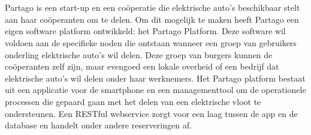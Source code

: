
\chapter{}
\label{ch:inleiding}

Partago is een start-up en een coöperatie die elektrische auto's beschikbaar stelt aan haar coöperanten om te delen. Om dit mogelijk te maken heeft Partago een eigen software platform ontwikkeld: het Partago Platform. Deze software wil voldoen aan de specifieke noden die ontstaan wanneer een groep van gebruikers onderling elektrische auto's wil delen. Deze groep van burgers kunnen de coöperanten zelf zijn, maar evengoed een lokale overheid of een bedrijf dat elektrische auto's wil delen onder haar werknemers. Het Partago platform bestaat uit een applicatie voor de smartphone en een managementtool om de operationele processen die gepaard gaan met het delen van een elektrische vloot te ondersteunen. Een RESTful webservice zorgt voor een laag tussen de app en de database en handelt onder andere reserveringen af.

